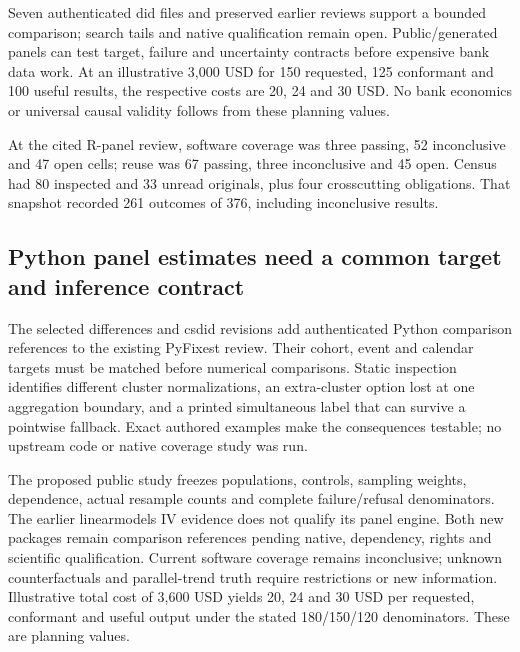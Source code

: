 Seven authenticated did files and preserved earlier reviews support a
bounded comparison; search tails and native qualification remain open.
Public/generated panels can test target, failure and uncertainty
contracts before expensive bank data work. At an illustrative 3,000 USD
for 150 requested, 125 conformant and 100 useful results, the respective
costs are 20, 24 and 30 USD. No bank economics or universal causal
validity follows from these planning values.
\citep{exec24_panelr_contract}

At the cited R-panel review, software coverage was three passing, 52
inconclusive and 47 open cells; reuse was 67 passing, three inconclusive
and 45 open. Census had 80 inspected and 33 unread originals, plus four
crosscutting obligations. That snapshot recorded 261 outcomes of 376,
including inconclusive results.
\citep{sp24panelr_reader,sp24panelr_progress}

\hypertarget{python-panel-estimates-need-a-common-target-and-inference-contract}{%
\subsection{Python panel estimates need a common target and inference
contract}\label{python-panel-estimates-need-a-common-target-and-inference-contract}}

The selected differences and csdid revisions add authenticated Python
comparison references to the existing PyFixest review. Their cohort,
event and calendar targets must be matched before numerical comparisons.
Static inspection identifies different cluster normalizations, an
extra-cluster option lost at one aggregation boundary, and a printed
simultaneous label that can survive a pointwise fallback. Exact authored
examples make the consequences testable; no upstream code or native
coverage study was run.
\citep{exec24_panelpy_differences,exec24_panelpy_csdid,exec24_panelpy_contract}

The proposed public study freezes populations, controls, sampling
weights, dependence, actual resample counts and complete failure/refusal
denominators. The earlier linearmodels IV evidence does not qualify its
panel engine. Both new packages remain comparison references pending
native, dependency, rights and scientific qualification. Current
software coverage remains inconclusive; unknown counterfactuals and
parallel-trend truth require restrictions or new information.
Illustrative total cost of 3,600 USD yields 20, 24 and 30 USD per
requested, conformant and useful output under the stated 180/150/120
denominators. These are planning values. \citep{exec24_panelpy_contract}

